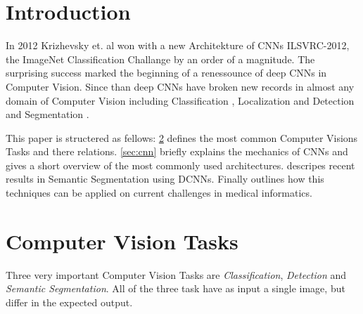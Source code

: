 \section{Introduction}\label{sec:introduction}

In 2012 Krizhevsky et. al \cite{AlexNet} won with a new Architekture of CNNs ILSVRC-2012, the ImageNet Classification Challange by an order of a magnitude. The surprising success marked the beginning of a renessounce of deep CNNs in Computer Vision. Since than deep CNNs have broken new records in almost any domain of Computer Vision including Classification \cite{AlexNet,VGG16,googLeNeT}, Localization and Detection \cite{RNN,overfeat} and Segmentation \cite{fcn,CRF1,googleSeg}.


This paper is structered as fellows: \cref{sec:tasks} defines the most common Computer Visions Tasks and there relations. \cref{sec:cnn} briefly explains the mechanics of CNNs and gives a short overview of the most commonly used architectures.  descripes recent results in Semantic Segmentation using \Glspl{DCNN}. Finally  outlines how this techniques can be applied on current challenges in medical informatics.


\section{Computer Vision Tasks} \label{sec:tasks}

Three very important Computer Vision Tasks are \emph{Classification}, \emph{Detection} and \emph{Semantic Segmentation}. All of the three task have as input a single image, but differ in the expected output.

\iffalse

\section{Historical Review}\label{sec:review}



Krizhevsky et. al \cite{AlexNet} won the .

AlexNet was improved by several Authors in the succeeding years to archieve even better classification results in the ILSVRC-2013 and 2014. Most notable are GoogLeNet \cite{googLeNeT} and VGG16 \cite{VGG16}. Beeing designed independently, both Networks utilize filters with very small kernel size ($3\times 3$ and $1 \times 1$) and other parameter reduction techniques in order to severely increase the deepth of their network.


\cite{AlexNet} al introduced a novel \gls{CNN} architecture. 

\fi







